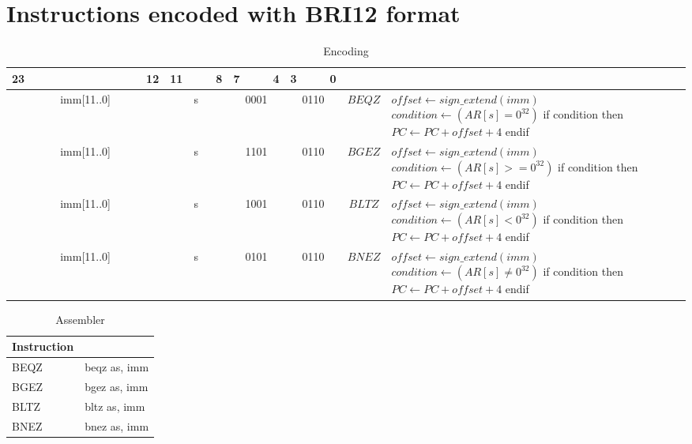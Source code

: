\section{Instructions encoded with BRI12 format}
\begin{smalltables}
	\begin{longtable}{llllllllllllllllllllllll  p{1cm}  p{7cm} | }
		\caption{Encoding\label{long}}\\
		23 & & & & & & & & & & & 12 & 11 & & & 8 & 7 & & & 4 & 3 & & & 0 & &
		\multicolumn{1}{c}{}\\
		\hline
		\multicolumn{12}{|c|}{imm[11..0]} & \multicolumn{4}{c|}{s} & \multicolumn{4}{c|}{0001} & \multicolumn{4}{c|}{0110} & \multicolumn{1}{c|}{$BEQZ$} & $offset \leftarrow sign\_extend(imm)$ \newline $condition \leftarrow (AR[s] = 0^{32})$ \newline if condition then \newline $PC \leftarrow PC + offset + 4$ \newline endif\\ \hline
		\multicolumn{12}{|c|}{imm[11..0]} & \multicolumn{4}{c|}{s} & \multicolumn{4}{c|}{1101} & \multicolumn{4}{c|}{0110} & \multicolumn{1}{c|}{$BGEZ$} & $offset \leftarrow sign\_extend(imm)$ \newline $condition \leftarrow (AR[s] >= 0^{32})$ \newline if condition then \newline $PC \leftarrow PC + offset + 4$ \newline endif\\ \hline
		\multicolumn{12}{|c|}{imm[11..0]} & \multicolumn{4}{c|}{s} & \multicolumn{4}{c|}{1001} & \multicolumn{4}{c|}{0110} & \multicolumn{1}{c|}{$BLTZ$} & $offset \leftarrow sign\_extend(imm)$ \newline $condition \leftarrow (AR[s] < 0^{32})$ \newline if condition then \newline $PC \leftarrow PC + offset + 4$ \newline endif\\ \hline
		\multicolumn{12}{|c|}{imm[11..0]} & \multicolumn{4}{c|}{s} & \multicolumn{4}{c|}{0101} & \multicolumn{4}{c|}{0110} & \multicolumn{1}{c|}{$BNEZ$} & $offset \leftarrow sign\_extend(imm)$ \newline $condition \leftarrow (AR[s] \neq 0^{32})$ \newline if condition then \newline $PC \leftarrow PC + offset + 4$ \newline endif\\ \hline
	\end{longtable}

	\begin{longtable}{|p{5cm}|p{5cm}|}
		\caption{Assembler\label{long}}\\		
		\hline
		Instruction & \\
		\hline
		BEQZ & beqz as, imm\\ \hline
		BGEZ & bgez as, imm\\ \hline
		BLTZ & bltz as, imm\\ \hline
		BNEZ & bnez as, imm\\ \hline
	\end{longtable}
\end{smalltables}